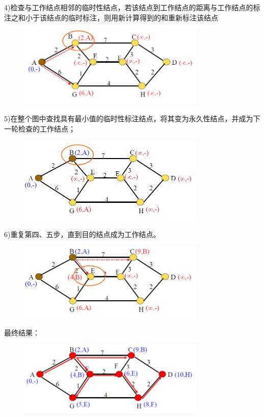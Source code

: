 \documentclass[11pt,a4paper,openany]{book}
\begin{document}
4)检查与工作结点相邻的临时性结点，若该结点到工作结点的距离与工作结点的标注之和小于该结点的临时标注，则用新计算得到的和重新标注该结点
\begin{figure}[H]
  \centering
  \includegraphics[width=0.8\textwidth]{dj4.png}\\
  \caption*{}
\end{figure}
5)在整个图中查找具有最小值的临时性标注结点，将其变为永久性结点，并成为下一轮检查的工作结点；
\begin{figure}[H]
  \centering
  \includegraphics[width=0.8\textwidth]{dj5.png}\\
  \caption*{}
\end{figure}
6)重复第四、五步，直到目的结点成为工作结点。
\begin{figure}[H]
  \centering
  \includegraphics[width=0.8\textwidth]{dj6.png}\\
  \caption*{}
\end{figure}
最终结果：
\begin{figure}[H]
  \centering
  \includegraphics[width=0.8\textwidth]{dj8.png}\\
  \caption*{}
\end{figure}
\end{document}
